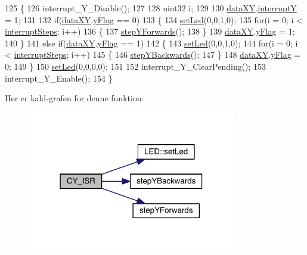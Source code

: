 \begin{DoxyCode}
125 \{
126   interrupt\_Y\_Disable();
127   
128   uint32 i;
129   
130   \hyperlink{data_8h_a89d7998a721b3f36f9f4131e7a5e42d2}{dataXY}.\hyperlink{data_8h_a0149ea97a32442280eb1c0b30c1eeaf1}{interruptY} = 1;
131   
132   \textcolor{keywordflow}{if}(\hyperlink{data_8h_a89d7998a721b3f36f9f4131e7a5e42d2}{dataXY}.\hyperlink{data_8h_a2093b99c34cd9ec2a282b9c4c3f61935}{yFlag} == 0)
133   \{
134     \hyperlink{led_8h_a1d8e725e3829da99c1d027ba0a2ce57a}{setLed}(0,0,1,0);
135     \textcolor{keywordflow}{for}(i = 0; i < \hyperlink{xy_8h_a319d8f8cbb816fc1ca2306587712b0b7}{interruptSteps}; i++)
136     \{
137       \hyperlink{class_x_y_aee60e222d7c603de314c886d5e922a53}{stepYForwards}();
138     \}
139     \hyperlink{data_8h_a89d7998a721b3f36f9f4131e7a5e42d2}{dataXY}.\hyperlink{data_8h_a2093b99c34cd9ec2a282b9c4c3f61935}{yFlag} = 1;
140   \}
141   \textcolor{keywordflow}{else} \textcolor{keywordflow}{if}(\hyperlink{data_8h_a89d7998a721b3f36f9f4131e7a5e42d2}{dataXY}.\hyperlink{data_8h_a2093b99c34cd9ec2a282b9c4c3f61935}{yFlag} == 1)
142   \{
143     \hyperlink{led_8h_a1d8e725e3829da99c1d027ba0a2ce57a}{setLed}(0,0,1,0);
144     \textcolor{keywordflow}{for}(i = 0; i < \hyperlink{xy_8h_a319d8f8cbb816fc1ca2306587712b0b7}{interruptSteps}; i++)
145     \{
146       \hyperlink{class_x_y_aea96dacda1955992c5436dcb829daa26}{stepYBackwards}();
147     \}
148     \hyperlink{data_8h_a89d7998a721b3f36f9f4131e7a5e42d2}{dataXY}.\hyperlink{data_8h_a2093b99c34cd9ec2a282b9c4c3f61935}{yFlag} = 0;
149   \}
150   \hyperlink{led_8h_a1d8e725e3829da99c1d027ba0a2ce57a}{setLed}(0,0,0,0);
151   
152   interrupt\_Y\_ClearPending();
153   interrupt\_Y\_Enable();
154 \}
\end{DoxyCode}


Her er kald-\/grafen for denne funktion\+:
\nopagebreak
\begin{figure}[H]
\begin{center}
\leavevmode
\includegraphics[width=259pt]{db/d87/class_x_y_ac83f0a0694002bf5e18e2d5bf499ba7e_cgraph}
\end{center}
\end{figure}


